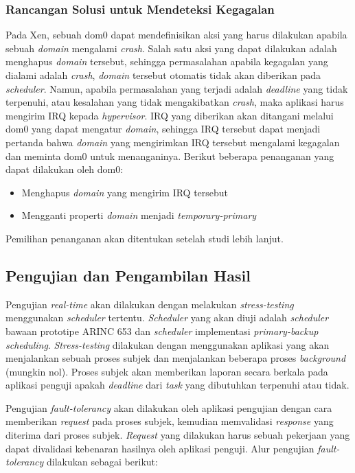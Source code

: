 \subsubsection{Rancangan Solusi untuk Mendeteksi Kegagalan}

Pada Xen, sebuah dom0 dapat mendefinisikan aksi yang harus dilakukan apabila sebuah
\textit{domain} mengalami \textit{crash}.  Salah satu aksi yang dapat dilakukan adalah menghapus
\textit{domain} tersebut, sehingga permasalahan apabila kegagalan yang dialami adalah
\textit{crash}, \textit{domain} tersebut otomatis tidak akan diberikan pada \textit{scheduler}.
Namun, apabila permasalahan yang terjadi adalah \textit{deadline} yang tidak terpenuhi, atau
kesalahan yang tidak mengakibatkan \textit{crash}, maka aplikasi harus mengirim IRQ kepada
\textit{hypervisor}.  IRQ yang diberikan akan ditangani melalui dom0 yang dapat mengatur
\textit{domain}, sehingga IRQ tersebut dapat menjadi pertanda bahwa \textit{domain} yang
mengirimkan IRQ tersebut mengalami kegagalan dan meminta dom0 untuk menanganinya.  Berikut
beberapa penanganan yang dapat dilakukan oleh dom0:

\begin{itemize}
    \item Menghapus \textit{domain} yang mengirim IRQ tersebut
    \item Mengganti properti \textit{domain} menjadi \textit{temporary-primary}
\end{itemize}

Pemilihan penanganan akan ditentukan setelah studi lebih lanjut.

\subsection{Pengujian dan Pengambilan Hasil}

Pengujian \textit{real-time} akan dilakukan dengan melakukan \textit{stress-testing} menggunakan
\textit{scheduler} tertentu.  \textit{Scheduler} yang akan diuji adalah \textit{scheduler}
bawaan prototipe ARINC 653 dan \textit{scheduler} implementasi \textit{primary-backup
scheduling}.  \textit{Stress-testing} dilakukan dengan menggunakan aplikasi yang akan
menjalankan sebuah proses subjek dan menjalankan beberapa proses \textit{background} (mungkin
nol).  Proses subjek akan memberikan laporan secara berkala pada aplikasi penguji apakah
\textit{deadline} dari \textit{task} yang dibutuhkan terpenuhi atau tidak.

Pengujian \textit{fault-tolerancy} akan dilakukan oleh aplikasi pengujian dengan cara memberikan
\textit{request} pada proses subjek, kemudian memvalidasi \textit{response} yang diterima dari
proses subjek.  \textit{Request} yang dilakukan harus sebuah pekerjaan yang dapat divalidasi
kebenaran hasilnya oleh aplikasi penguji.  Alur pengujian \textit{fault-tolerancy} dilakukan
sebagai berikut:


